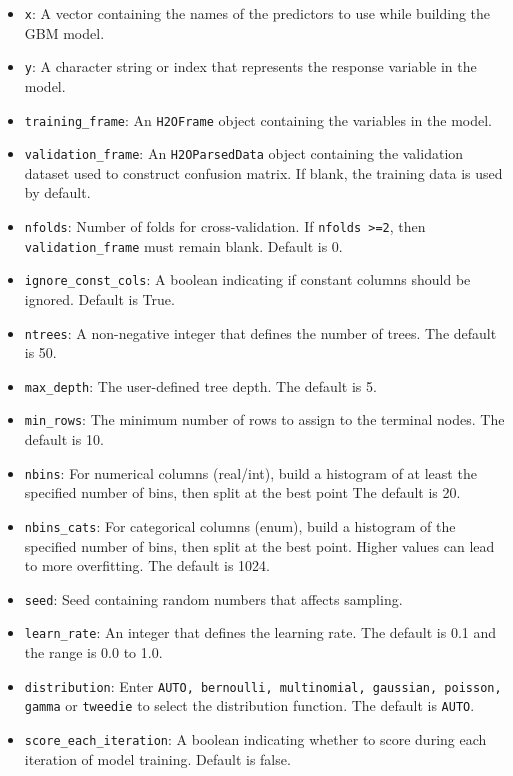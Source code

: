 \begin{itemize}
\item {\texttt{x}}: A vector containing the names of the predictors to use while building the GBM model. 
\item {\texttt{y}}: A character string or index that represents the response variable in the model.  
\item {\texttt{training\_frame}}: An \texttt{H2OFrame} object containing the variables in the model. 
\item {\texttt{validation\_frame}}: An \texttt{H2OParsedData} object containing the validation dataset used to construct confusion matrix. If  blank, the training data is used by default.
\item {\texttt{nfolds}}: Number of folds for cross-validation. If \texttt{nfolds >=2}, then \texttt{validation\_frame} must remain blank. Default is 0. %
\item {\texttt{ignore\_const\_cols}}: A boolean indicating if constant columns should be ignored.  Default is True.
\item {\texttt{ntrees}}: A non-negative integer that defines the number of trees. The default is 50.
\item {\texttt{max\_depth}}: The user-defined tree depth. The default is 5.
\item {\texttt{min\_rows}}: The minimum number of rows to assign to the terminal nodes. The default is 10.
\item {\texttt{nbins}}: For numerical columns (real/int), build a histogram of at least the specified number of bins, then split at the best point The default is 20.
\item {\texttt{nbins\_cats}}: For categorical columns (enum), build a histogram of the specified number of bins, then split at the best point. Higher values can lead to more overfitting.  The default is 1024.
\item {\texttt{seed}}: Seed containing random numbers that affects sampling.
\item {\texttt{learn\_rate}}: An integer that defines the learning rate. The default is 0.1 and the range is 0.0 to 1.0.
\item {\texttt{distribution}}: Enter {\texttt{AUTO, bernoulli, multinomial, gaussian, poisson, gamma}} or {\texttt{tweedie}} to select the distribution function. The default is {\texttt{AUTO}}.
\item {\texttt{score\_each\_iteration}}: A boolean indicating whether to score during each iteration of model training.  Default is false.

\end{itemize}
